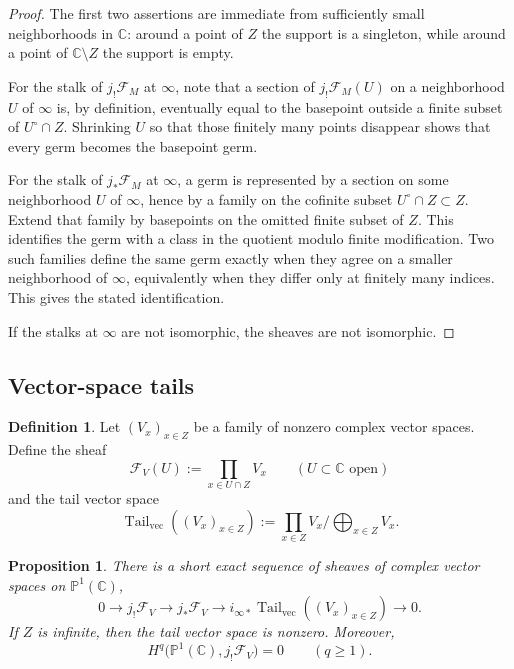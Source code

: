 \documentclass[11pt,a4paper]{article}
\numberwithin{equation}{section}
\newtheorem{proposition}[theorem]{Proposition}
\theoremstyle{definition}
\newtheorem{definition}[theorem]{Definition}
\theoremstyle{remark}
\DeclareMathOperator{\Tail}{Tail}
\newcommand{\CC}{\mathbb C}
\newcommand{\PP}{\mathbb P}
\begin{document}
\begin{proof}
The first two assertions are immediate from sufficiently small neighborhoods in $\CC$: around a point of $Z$ the support is a singleton, while around a point of $\CC\setminus Z$ the support is empty.

For the stalk of $j_!\mathcal F_M$ at $\infty$, note that a section of $j_!\mathcal F_M(U)$ on a neighborhood $U$ of $\infty$ is, by definition, eventually equal to the basepoint outside a finite subset of $U^\circ\cap Z$.  Shrinking $U$ so that those finitely many points disappear shows that every germ becomes the basepoint germ.

For the stalk of $j_*\mathcal F_M$ at $\infty$, a germ is represented by a section on some neighborhood $U$ of $\infty$, hence by a family on the cofinite subset $U^\circ\cap Z\subset Z$.  Extend that family by basepoints on the omitted finite subset of $Z$.  This identifies the germ with a class in the quotient modulo finite modification.  Two such families define the same germ exactly when they agree on a smaller neighborhood of $\infty$, equivalently when they differ only at finitely many indices.  This gives the stated identification.

If the stalks at $\infty$ are not isomorphic, the sheaves are not isomorphic.
\end{proof}

\subsection{Vector-space tails}

\begin{definition}
Let $(V_x)_{x\in Z}$ be a family of nonzero complex vector spaces.  Define the sheaf
\[
\mathcal F_V(U):=\prod_{x\in U\cap Z}V_x
\qquad (U\subset\CC\text{ open})
\]
and the tail vector space
\[
\Tail_{\mathrm{vec}}((V_x)_{x\in Z}):=\prod_{x\in Z}V_x\Big/\bigoplus_{x\in Z}V_x.
\]
\end{definition}

\begin{proposition}\label{prop:vector-tail-exact}
There is a short exact sequence of sheaves of complex vector spaces on $\PP^1(\CC)$,
\[
0\longrightarrow j_!\mathcal F_V
\longrightarrow j_*\mathcal F_V
\longrightarrow i_{\infty *}\Tail_{\mathrm{vec}}((V_x)_{x\in Z})
\longrightarrow0.
\]
If $Z$ is infinite, then the tail vector space is nonzero.  Moreover,
\[
H^q\bigl(\PP^1(\CC),j_!\mathcal F_V\bigr)=0
\qquad (q\ge1).
\]
\end{proposition}
\end{document}
